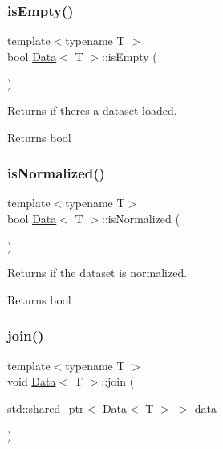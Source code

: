 \subsubsection{\texorpdfstring{is\+Empty()}{isEmpty()}}
{\footnotesize\ttfamily template$<$typename T $>$ \\
bool \mbox{\hyperlink{class_data}{Data}}$<$ T $>$\+::is\+Empty (\begin{DoxyParamCaption}{ }\end{DoxyParamCaption})}



Returns if there\textquotesingle{}s a dataset loaded. 

\begin{DoxyReturn}{Returns}
bool 
\end{DoxyReturn}
\mbox{\label{class_data_a6b91ca6585e8638f1b359a6f2bb827d7}} 
\subsubsection{\texorpdfstring{is\+Normalized()}{isNormalized()}}
{\footnotesize\ttfamily template$<$typename T$>$ \\
bool \mbox{\hyperlink{class_data}{Data}}$<$ T $>$\+::is\+Normalized (\begin{DoxyParamCaption}{ }\end{DoxyParamCaption})\hspace{0.3cm}{\ttfamily [inline]}}



Returns if the dataset is normalized. 

\begin{DoxyReturn}{Returns}
bool 
\end{DoxyReturn}
\mbox{\label{class_data_abf57674d356299c2be916331791e8f12}} 
\subsubsection{\texorpdfstring{join()}{join()}}
{\footnotesize\ttfamily template$<$typename T $>$ \\
void \mbox{\hyperlink{class_data}{Data}}$<$ T $>$\+::join (\begin{DoxyParamCaption}\item[{std\+::shared\+\_\+ptr$<$ \mbox{\hyperlink{class_data}{Data}}$<$ T $>$ $>$}]{data }\end{DoxyParamCaption})}



